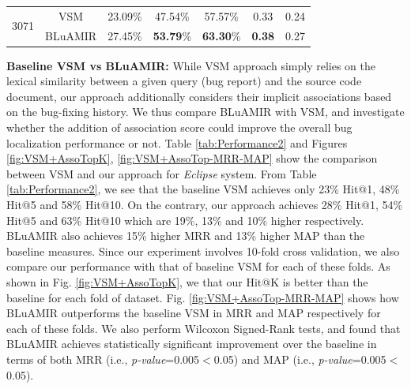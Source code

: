 \documentclass[sigconf,review,anonymous]{acmart}
\begin{document}
\begin{table}[!tb]
{\begin{tabular}{c|c|c|c|c|c|c}
			\multirow{2}{*}{3071}                                                                               & VSM & 23.09\% & 47.54\% & 57.57\% & 0.33 & 0.24 \\  \cline{2-7}   & BLuAMIR     & 27.45\%                                                 & \textbf{53.79}\%                                                 & \textbf{63.30}\%                                                  &   \textbf{0.38}  &  0.27    \\ 
			\hline
		\end{tabular}
		
	}
	\centering
\end{table}

\textbf{Baseline VSM vs BLuAMIR:} While VSM approach simply relies on the lexical similarity between a given query (bug report) and the source code document, our approach additionally considers their implicit associations based on the bug-fixing history.
We thus compare BLuAMIR with VSM, and investigate whether the addition of association score could improve the overall bug localization performance or not. Table \ref{tab:Performance2} and Figures \ref{fig:VSM+AssoTopK}, \ref{fig:VSM+AssoTop-MRR-MAP} show the comparison between VSM and our approach for \emph{Eclipse} system. From Table \ref{tab:Performance2}, we see that the baseline VSM achieves only 23\% Hit@1, 48\% Hit@5 and 58\% Hit@10. On the contrary, our approach achieves 28\% Hit@1, 54\% Hit@5 and 63\% Hit@10 which are 19\%, 13\% and 10\% higher respectively. BLuAMIR also achieves 15\% higher MRR and 13\% higher MAP than the baseline measures. Since our experiment involves 10-fold cross validation, we also compare our performance with that of baseline VSM for each of these folds. As shown in Fig. \ref{fig:VSM+AssoTopK}, we that our Hit@K is better than the baseline for each fold of dataset. Fig. \ref{fig:VSM+AssoTop-MRR-MAP} shows how BLuAMIR outperforms the baseline VSM in MRR and MAP respectively for each of these folds. We also perform Wilcoxon Signed-Rank tests, and found that BLuAMIR achieves statistically significant improvement over the baseline in terms of both MRR (i.e., \emph{p-value}=0.005$<$0.05) and MAP (i.e., \emph{p-value}=0.005$<$0.05).
\end{document}
